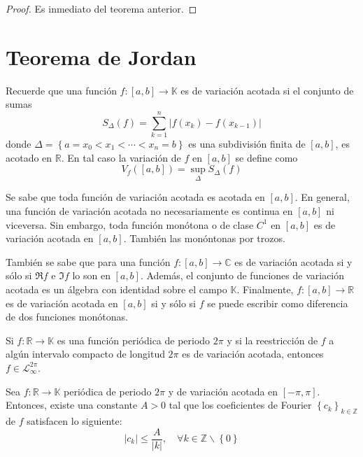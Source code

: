 \documentclass[12pt]{report}
\theoremstyle{largebreak}
\renewcommand{\leq}{\ensuremath{\leqslant}}
\newcommand\abs[1]{\ensuremath{\left|#1\right|}}
\newcommand\cf[3]{\ensuremath{#1:#2\rightarrow#3}}
\begin{document}
    \begin{proof}
        Es inmediato del teorema anterior.
    \end{proof}

    \section{Teorema de Jordan}

    Recuerde que una función $\cf{f}{[a,b]}{\mathbb{K}}$ es de variación acotada si el conjunto de sumas
    \begin{equation*}
        S_\Delta(f)=\sum_{ k=1}^n\abs{f(x_k)-f(x_{ k-1})}
    \end{equation*}
    donde $\Delta=\left\{a=x_0<x_1<\cdots<x_n=b \right\}$ es una subdivisión finita de $[a,b]$, es acotado en $\mathbb{R}$. En tal caso la variación de $f$ en $[a,b]$ se define como
    \begin{equation*}
        V_f([a,b])=\sup_{\Delta}S_\Delta(f)
    \end{equation*}

    Se sabe que toda función de variación acotada es acotada en $[a,b]$. En general, una función de variación acotada no necesariamente es continua en $[a,b]$ ni viceversa. Sin embargo, toda función monótona o de clase $C^1$ en $[a,b]$ es de variación acotada en $[a,b]$. También las monóntonas por trozos.

    También se sabe que para una función $\cf{f}{[a,b]}{\mathbb{C}}$ es de variación acotada si y sólo si $\Re f$ e $\Im f$ lo son en $[a,b]$. Además, el conjunto de funciones de variación acotada es un álgebra con identidad sobre el campo $\mathbb{K}$. Finalmente, $\cf{f}{[a,b]}{\mathbb{R}}$ es de variación acotada en $[a,b]$ si y sólo si $f$ se puede escribir como diferencia de dos funciones monótonas.

    \begin{obs}
        Si $\cf{f}{\mathbb{R}}{\mathbb{K}}$ es una función periódica de periodo $2\pi$ y si la reestricción de $f$ a algún intervalo compacto de longitud $2\pi$ es de variación acotada, entonces $f\in\mathcal{L}_{\infty}^{2\pi}$.
    \end{obs}

    \begin{lema}
        Sea $\cf{f}{\mathbb{R}}{\mathbb{K}}$ periódica de periodo $2\pi$ y de variación acotada en $[-\pi,\pi]$. Entonces, existe una constante $A>0$ tal que los coeficientes de Fourier $\left\{c_k \right\}_{ k\in\mathbb{Z}}$ de $f$ satisfacen lo siguiente:
        \begin{equation*}
            \abs{c_k}\leq\frac{A}{\abs{k}},\quad\forall k\in\mathbb{Z}\backslash\left\{0\right\}
        \end{equation*} 
    \end{lema}
\end{document}
